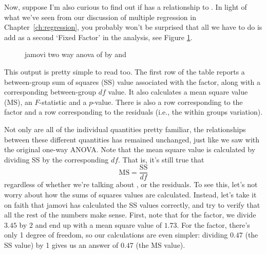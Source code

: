 Now, suppose I'm also curious to find out if  has a relationship to . In light of what we've seen from our discussion of multiple regression in Chapter~\ref{ch:regression}, you probably won't be surprised that all we have to do is add  as a second `Fixed Factor' in the analysis, see Figure \ref{fig:factorialanova3}.

\begin{figure}[!htb]
\begin{center}
\caption{jamovi two way anova of  by  and }
\label{fig:factorialanova3}
\HR
\end{center}
\end{figure}

This output is pretty simple to read too. The first row of the table reports a between-group sum of squares (SS) value associated with the  factor, along with a corresponding between-group $df$ value. It also calculates a mean square value (MS), an $F$-statistic and a $p$-value. There is also a row corresponding to the  factor and a row corresponding to the residuals (i.e., the within groups variation). 

Not only are all of the individual quantities pretty familiar, the relationships between these different quantities has remained unchanged, just like we saw with the original one-way ANOVA. Note that the mean square value is calculated by dividing SS by the corresponding $df$. That is, it's still true that
$$
\mbox{MS} = \frac{\mbox{SS}}{df}
$$
regardless of whether we're talking about ,  or the residuals. To see this, let's not worry about how the sums of squares values are calculated. Instead, let's take it on faith that jamovi has calculated the SS values correctly, and try to verify that all the rest of the numbers make sense. First, note that for the  factor, we divide $3.45$ by $2$ and end up with a mean square value of $1.73$. For the  factor, there's only 1 degree of freedom, so our calculations are even simpler: dividing $0.47$ (the SS value) by 1 gives us an answer of $0.47$ (the MS value). 

